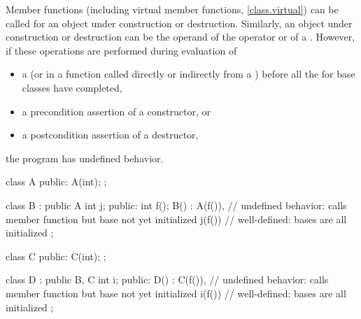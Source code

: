 \pnum
{}%
Member functions (including virtual member functions, \ref{class.virtual}) can be
called for an object under construction or destruction.
Similarly, an object under construction or destruction can be the operand of the
operator or of a
.
However, if these operations are performed
during evaluation of
\begin{itemize}
\item
a 
(or in a function called directly or indirectly from a
)
before all the
for base classes have completed,
\item
a precondition assertion of a constructor, or
\item
a postcondition assertion of a destructor,
\end{itemize}
the program has undefined behavior.
%
%
%
%
%
\begin{example}
\begin{codeblock}
class A {
public:
  A(int);
};

class B : public A {
  int j;
public:
  int f();
  B() : A(f()),     // undefined behavior: calls member function but base  not yet initialized
  j(f()) { }        // well-defined: bases are all initialized
};

class C {
public:
  C(int);
};

class D : public B, C {
  int i;
public:
  D() : C(f()),     // undefined behavior: calls member function but base  not yet initialized
  i(f()) { }        // well-defined: bases are all initialized
};
\end{codeblock}
\end{example}

